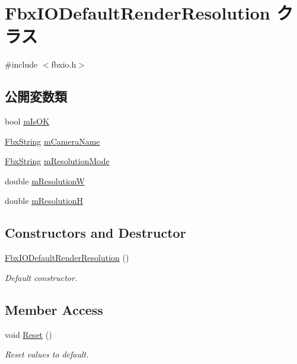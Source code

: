 \hypertarget{class_fbx_i_o_default_render_resolution}{}\section{Fbx\+I\+O\+Default\+Render\+Resolution クラス}
\label{class_fbx_i_o_default_render_resolution}


{\ttfamily \#include $<$fbxio.\+h$>$}

\subsection*{公開変数類}
\begin{DoxyCompactItemize}
\item 
bool \hyperlink{class_fbx_i_o_default_render_resolution_ae56f217dc572df5e9fe42f15cca70e6e}{m\+Is\+OK}
\item 
\hyperlink{class_fbx_string}{Fbx\+String} \hyperlink{class_fbx_i_o_default_render_resolution_a02557aa4bb0fbe0cbdc31e721304de97}{m\+Camera\+Name}
\item 
\hyperlink{class_fbx_string}{Fbx\+String} \hyperlink{class_fbx_i_o_default_render_resolution_a9c5e1f0ab623fe67690f95517665ebca}{m\+Resolution\+Mode}
\item 
double \hyperlink{class_fbx_i_o_default_render_resolution_a1d437196200a13c117228782e95102bd}{m\+ResolutionW}
\item 
double \hyperlink{class_fbx_i_o_default_render_resolution_a3d72888dd0b6c5e92163872bb050dc74}{m\+ResolutionH}
\end{DoxyCompactItemize}
\subsection*{Constructors and Destructor}
\begin{DoxyCompactItemize}
\item 
\hyperlink{class_fbx_i_o_default_render_resolution_aba11fab3ca530e3eae26b19d74b5dff5}{Fbx\+I\+O\+Default\+Render\+Resolution} ()
\begin{DoxyCompactList}\small\item\em Default constructor. \end{DoxyCompactList}\end{DoxyCompactItemize}
\subsection*{Member Access}
\begin{DoxyCompactItemize}
\item 
void \hyperlink{class_fbx_i_o_default_render_resolution_a31654b516324bdfe779c458d518ae4d6}{Reset} ()
\begin{DoxyCompactList}\small\item\em Reset values to default. \end{DoxyCompactList}\end{DoxyCompactItemize}


